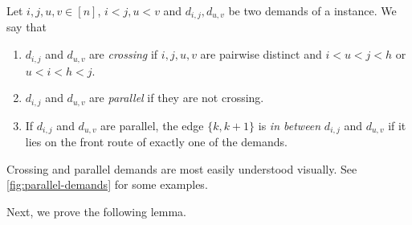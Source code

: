 \begin{definition}
	Let $i, j, u, v \in [n]$, $i < j, u < v$ and $d_{i,j}, d_{u, v}$ be two demands of a \RRL instance.
	We say that
	\begin{enumerate}
		\item $d_{i, j}$ and $d_{u, v}$ are \emph{crossing} if $i, j, u, v$ are pairwise distinct and $i < u < j < h$ or $u < i < h < j$.
		\item $d_{i, j}$ and $d_{u, v}$ are \emph{parallel} if they are not crossing.
		\item If $d_{i, j}$ and $d_{u, v}$ are parallel, the edge $\{k, k+1\}$ is \emph{in between}
		$d_{i,j}$ and $d_{u, v}$ if it lies on the front route of exactly one of the demands.
	\end{enumerate}
\end{definition}
Crossing and parallel demands are most easily understood visually.
See \cref{fig:parallel-demands} for some examples.


Next, we prove the following lemma.

